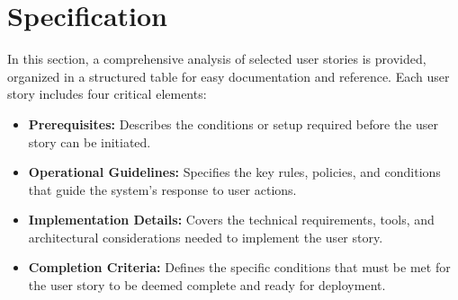 \section{Specification}
In this section, a comprehensive analysis of selected user stories is provided, organized in a structured table for easy documentation and reference. Each user story includes four critical elements:
\begin{itemize}
    \item \textbf{Prerequisites:} Describes the conditions or setup required before the user story can be initiated.
    \item \textbf{Operational Guidelines:} Specifies the key rules, policies, and conditions that guide the system's response to user actions.
    \item \textbf{Implementation Details:} Covers the technical requirements, tools, and architectural considerations needed to implement the user story.
    \item \textbf{Completion Criteria:} Defines the specific conditions that must be met for the user story to be deemed complete and ready for deployment.
\end{itemize}

